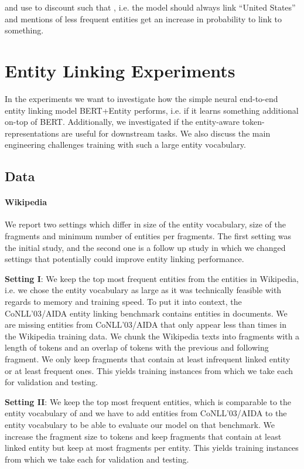 \documentclass[11pt,a4paper]{article}
\begin{document}
and use  to discount  such that , i.e. the model should always link ``United States'' and mentions of less frequent entities get an increase in probability to link to something. 

\section{Entity Linking Experiments}

In the experiments we want to investigate how the simple neural end-to-end entity linking model BERT+Entity performs, i.e. if it learns something additional on-top of BERT. Additionally, we investigated if the entity-aware token-representations are useful for downstream tasks. We also discuss the main engineering challenges training with such a large entity vocabulary.  

\subsection{Data}

\paragraph{Wikipedia}
\label{sec:data}
We report two settings which differ in size of the entity vocabulary, size of the fragments and minimum number of entities per fragments. The first setting was the initial study, and the second one is a follow up study in which we changed settings that potentially could improve entity linking performance.

\textbf{Setting I}: We keep the  top most frequent entities from the  entities in Wikipedia, i.e. we chose the entity vocabulary as large as it was technically feasible with regards to memory and training speed. To put it into context, the CoNLL’03/AIDA entity linking benchmark contains  entities in  documents. We are missing  entities from CoNLL’03/AIDA that only appear less than  times in the Wikipedia training data. We chunk the Wikipedia texts into fragments with a length of  tokens and an overlap of  tokens with the previous and following fragment. We only keep fragments that contain at least  infrequent linked entity or at least  frequent ones. This yields  training instances from which we take  each for validation and testing. 

\textbf{Setting II}: We keep the  top most frequent entities, which is comparable to the entity vocabulary of \citet{kolitsas-etal-2018-end/Ganea} and we have to add  entities from CoNLL’03/AIDA to the entity vocabulary to be able to evaluate our model on that benchmark. We increase the fragment size to  tokens and keep fragments that contain at least  linked entity but keep at most  fragments per entity. This yields  training instances from which we take  each for validation and testing.
\end{document}
